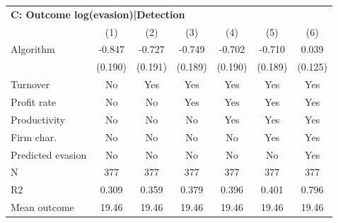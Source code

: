 \begin{tabular}{lcccccc}
\midrule \multicolumn{7}{l}{\textbf{C: Outcome log(evasion)|Detection}} \\ \multicolumn{1}{l}{} & (1) & (2) & (3) & (4) & (5) & (6) \\ \midrule
Algorithm   &      -0.847\sym{***}&      -0.727\sym{***}&      -0.749\sym{***}&      -0.702\sym{***}&      -0.710\sym{***}&       0.039         \\
            &     (0.190)         &     (0.191)         &     (0.189)         &     (0.190)         &     (0.189)         &     (0.125)         \\
\midrule
Turnover    &          No         &         Yes         &         Yes         &         Yes         &         Yes         &         Yes         \\
Profit rate &          No         &          No         &         Yes         &         Yes         &         Yes         &         Yes         \\
Productivity&          No         &          No         &          No         &         Yes         &         Yes         &         Yes         \\
Firm char.  &          No         &          No         &          No         &          No         &         Yes         &         Yes         \\
Predicted evasion&          No         &          No         &          No         &          No         &          No         &         Yes         \\
N           &         377         &         377         &         377         &         377         &         377         &         377         \\
R2          &       0.309         &       0.359         &       0.379         &       0.396         &       0.401         &       0.796         \\
Mean outcome&       19.46         &       19.46         &       19.46         &       19.46         &       19.46         &       19.46         \\
\bottomrule \end{tabular}
